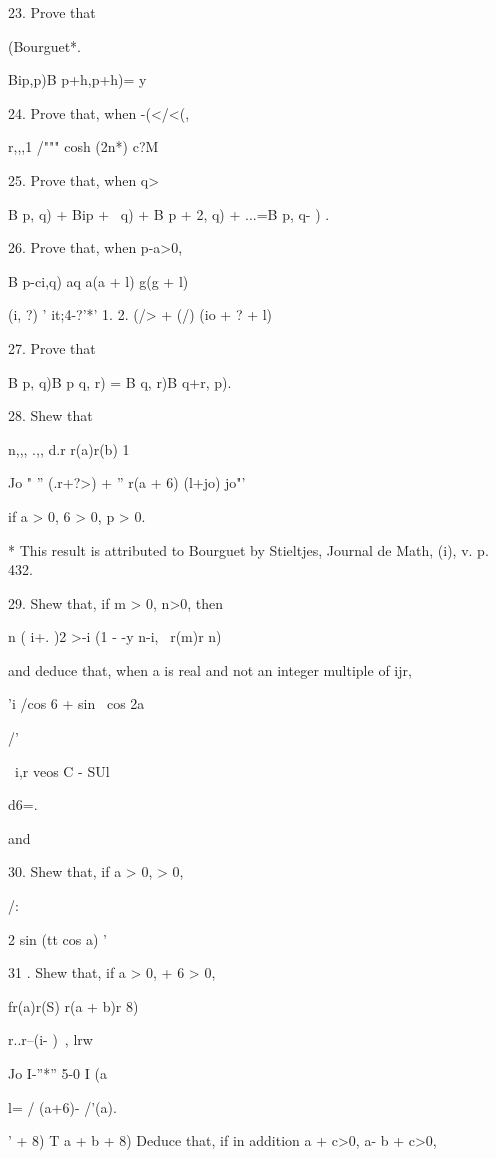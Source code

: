 23. Prove that

(Bourguet*.

Bip,p)B p+h,p+h)= y 

24. Prove that, when -(</<(,

r,,,1 /""" cosh (2n*) c?M

25. Prove that, when q>\,

B p, q) + Bip + \, q) + B p + 2, q) + ...=B p, q- ) .

26. Prove that, when p-a>0,

B p-ci,q) aq a(a + l) g(g + l)

 (i, ?) ' it;4-?'*' 1. 2. (/> + (/) (io + ? + l)

27. Prove that

B p, q)B p q, r) = B q, r)B q+r, p). 

28. Shew that

n,,, .,, d.r r(a)r(b) 1

Jo " '' (.r+?>) + '' r(a + 6) (l+jo) jo"'

if a > 0, 6 > 0, p > 0. 

* This result is attributed to Bourguet by Stieltjes, Journal de Math,
(i), v. p. 432.

%
%

29. Shew that, if m > 0, n>0, then

n ( i+. )2 >-i (1 - -y n-i, \ r(m)r n)

and deduce that, when a is real and not an integer multiple of ijr,

'i /cos 6 + sin \ cos 2a

/'

\ i,r veos C - SUl

d6=.

and

30. Shew that, if a > 0, > 0,

/:

2 sin (tt cos a) '



31 . Shew that, if a > 0, + 6 > 0,

fr(a)r(S) r(a + b)r 8)

r..r--(i- ) \,, lrw

Jo I-''*'' 5-0 I (a

l= / (a+6)- /'(a).

' + 8) T a + b + 8) Deduce that, if in addition a + c>0, a- b + c>0,

